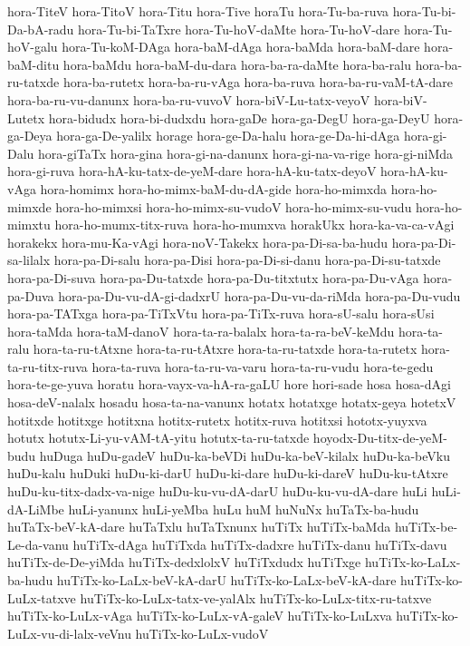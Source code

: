 {hora-TiteV
hora-TitoV
hora-Titu
hora-Tive
horaTu
hora-Tu-ba-ruva
hora-Tu-bi-Da-bA-radu
hora-Tu-bi-TaTxre
hora-Tu-hoV-daMte
hora-Tu-hoV-dare
hora-Tu-hoV-galu
hora-Tu-koM-DAga
hora-baM-dAga
hora-baMda
hora-baM-dare
hora-baM-ditu
hora-baMdu
hora-baM-du-dara
hora-ba-ra-daMte
hora-ba-ralu
hora-ba-ru-tatxde
hora-ba-rutetx
hora-ba-ru-vAga
hora-ba-ruva
hora-ba-ru-vaM-tA-dare
hora-ba-ru-vu-danunx
hora-ba-ru-vuvoV
hora-biV-Lu-tatx-veyoV
hora-biV-Lutetx
hora-bidudx
hora-bi-dudxdu
hora-gaDe
hora-ga-DegU
hora-ga-DeyU
hora-ga-Deya
hora-ga-De-yalilx
horage
hora-ge-Da-halu
hora-ge-Da-hi-dAga
hora-gi-Dalu
hora-giTaTx
hora-gina
hora-gi-na-danunx
hora-gi-na-va-rige
hora-gi-niMda
hora-gi-ruva
hora-hA-ku-tatx-de-yeM-dare
hora-hA-ku-tatx-deyoV
hora-hA-ku-vAga
hora-homimx
hora-ho-mimx-baM-du-dA-gide
hora-ho-mimxda
hora-ho-mimxde
hora-ho-mimxsi
hora-ho-mimx-su-vudoV
hora-ho-mimx-su-vudu
hora-ho-mimxtu
hora-ho-mumx-titx-ruva
hora-ho-mumxva
horakUkx
hora-ka-va-ca-vAgi
horakekx
hora-mu-Ka-vAgi
hora-noV-Takekx
hora-pa-Di-sa-ba-hudu
hora-pa-Di-sa-lilalx
hora-pa-Di-salu
hora-pa-Disi
hora-pa-Di-si-danu
hora-pa-Di-su-tatxde
hora-pa-Di-suva
hora-pa-Du-tatxde
hora-pa-Du-titxtutx
hora-pa-Du-vAga
hora-pa-Duva
hora-pa-Du-vu-dA-gi-dadxrU
hora-pa-Du-vu-da-riMda
hora-pa-Du-vudu
hora-pa-TATxga
hora-pa-TiTxVtu
hora-pa-TiTx-ruva
hora-sU-salu
hora-sUsi
hora-taMda
hora-taM-danoV
hora-ta-ra-balalx
hora-ta-ra-beV-keMdu
hora-ta-ralu
hora-ta-ru-tAtxne
hora-ta-ru-tAtxre
hora-ta-ru-tatxde
hora-ta-rutetx
hora-ta-ru-titx-ruva
hora-ta-ruva
hora-ta-ru-va-varu
hora-ta-ru-vudu
hora-te-gedu
hora-te-ge-yuva
horatu
hora-vayx-va-hA-ra-gaLU
hore
hori-sade
hosa
hosa-dAgi
hosa-deV-nalalx
hosadu
hosa-ta-na-vanunx
hotatx
hotatxge
hotatx-geya
hotetxV
hotitxde
hotitxge
hotitxna
hotitx-rutetx
hotitx-ruva
hotitxsi
hototx-yuyxva
hotutx
hotutx-Li-yu-vAM-tA-yitu
hotutx-ta-ru-tatxde
hoyodx-Du-titx-de-yeM-budu
huDuga
huDu-gadeV
huDu-ka-beVDi
huDu-ka-beV-kilalx
huDu-ka-beVku
huDu-kalu
huDuki
huDu-ki-darU
huDu-ki-dare
huDu-ki-dareV
huDu-ku-tAtxre
huDu-ku-titx-dadx-va-nige
huDu-ku-vu-dA-darU
huDu-ku-vu-dA-dare
huLi
huLi-dA-LiMbe
huLi-yanunx
huLi-yeMba
huLu
huM
huNuNx
huTaTx-ba-hudu
huTaTx-beV-kA-dare
huTaTxlu
huTaTxnunx
huTiTx
huTiTx-baMda
huTiTx-be-Le-da-vanu
huTiTx-dAga
huTiTxda
huTiTx-dadxre
huTiTx-danu
huTiTx-davu
huTiTx-de-De-yiMda
huTiTx-dedxlolxV
huTiTxdudx
huTiTxge
huTiTx-ko-LaLx-ba-hudu
huTiTx-ko-LaLx-beV-kA-darU
huTiTx-ko-LaLx-beV-kA-dare
huTiTx-ko-LuLx-tatxve
huTiTx-ko-LuLx-tatx-ve-yalAlx
huTiTx-ko-LuLx-titx-ru-tatxve
huTiTx-ko-LuLx-vAga
huTiTx-ko-LuLx-vA-galeV
huTiTx-ko-LuLxva
huTiTx-ko-LuLx-vu-di-lalx-veVnu
huTiTx-ko-LuLx-vudoV
}

